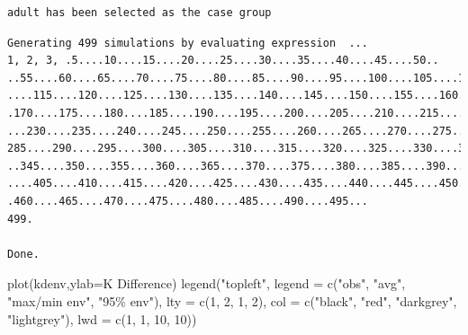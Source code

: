 \documentclass[
  letterpaper,
  DIV=11,
  numbers=noendperiod]{scrartcl}
\newenvironment{Shaded}{\begin{snugshade}}{\end{snugshade}}
\newcommand{\AttributeTok}[1]{\textcolor[rgb]{0.40,0.45,0.13}{#1}}
\newcommand{\DecValTok}[1]{\textcolor[rgb]{0.68,0.00,0.00}{#1}}
\newcommand{\FunctionTok}[1]{\textcolor[rgb]{0.28,0.35,0.67}{#1}}
\newcommand{\NormalTok}[1]{\textcolor[rgb]{0.00,0.23,0.31}{#1}}
\newcommand{\StringTok}[1]{\textcolor[rgb]{0.13,0.47,0.30}{#1}}
\begin{document}
\begin{verbatim}
adult has been selected as the case group
\end{verbatim}

\begin{verbatim}
Generating 499 simulations by evaluating expression  ...
1, 2, 3, .5....10....15....20....25....30....35....40....45....50..
..55....60....65....70....75....80....85....90....95....100....105....110
....115....120....125....130....135....140....145....150....155....160....165...
.170....175....180....185....190....195....200....205....210....215....220....225.
...230....235....240....245....250....255....260....265....270....275....280....
285....290....295....300....305....310....315....320....325....330....335....340..
..345....350....355....360....365....370....375....380....385....390....395....400
....405....410....415....420....425....430....435....440....445....450....455...
.460....465....470....475....480....485....490....495...
499.

Done.
\end{verbatim}

\begin{Shaded}
\begin{Highlighting}[]
\FunctionTok{plot}\NormalTok{(kdenv,}\AttributeTok{ylab=}\StringTok{\textquotesingle{}K Difference\textquotesingle{}}\NormalTok{)}
\FunctionTok{legend}\NormalTok{(}\StringTok{"topleft"}\NormalTok{, }\AttributeTok{legend =} \FunctionTok{c}\NormalTok{(}\StringTok{"obs"}\NormalTok{, }\StringTok{"avg"}\NormalTok{, }\StringTok{"max/min env"}\NormalTok{, }\StringTok{"95\% env"}\NormalTok{),}
       \AttributeTok{lty =} \FunctionTok{c}\NormalTok{(}\DecValTok{1}\NormalTok{, }\DecValTok{2}\NormalTok{, }\DecValTok{1}\NormalTok{, }\DecValTok{2}\NormalTok{), }\AttributeTok{col =} \FunctionTok{c}\NormalTok{(}\StringTok{"black"}\NormalTok{, }\StringTok{"red"}\NormalTok{, }\StringTok{"darkgrey"}\NormalTok{, }\StringTok{"lightgrey"}\NormalTok{),}
       \AttributeTok{lwd =} \FunctionTok{c}\NormalTok{(}\DecValTok{1}\NormalTok{, }\DecValTok{1}\NormalTok{, }\DecValTok{10}\NormalTok{, }\DecValTok{10}\NormalTok{))}
\end{Highlighting}
\end{Shaded}
\end{document}
